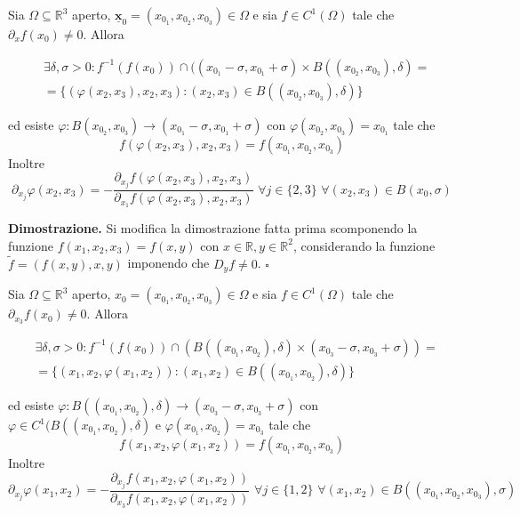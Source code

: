 \vspace{0.5cm}
\begin{theorem}[\textcolor{blue}{Funzione implicita rispetto a $y$ e $z$}]
Sia $\Omega \subseteq \mathbb{R}^3$ aperto, $\bm{\underline{x}}_0 = (x_{0_1}, x_{0_2}, x_{0_3}) \in \Omega$ e sia $f \in C^1 ( \Omega )$ tale che $\partial_x f(x_0) \neq 0$. Allora

\begin{align*}
&\exists \delta, \sigma > 0 : f^{-1}(f(x_0)) \cap ((x_{0_1} - \sigma, x_{0_1} + \sigma) \times B((x_{0_2}, x_{0_3}), \delta) = \\
&=\{ (\varphi(x_2, x_3), x_2, x_3) : (x_2, x_3) \in B((x_{0_2}, x_{0_3}), \delta) \}
\end{align*}

ed esiste $\varphi: B(x_{0_2}, x_{0_3}) \to (x_{0_1} - \sigma, x_{0_1} + \sigma)$ con $\varphi(x_{0_2}, x_{0_3}) = x_{0_1}$ tale che
$$
f(\varphi(x_2, x_3), x_2, x_3) = f(x_{0_1}, x_{0_2}, x_{0_3})
$$
Inoltre
$$
\partial_{x_j} \varphi(x_2, x_3) = -\frac{\partial_{x_j}f(\varphi(x_2, x_3), x_2, x_3)}{\partial_{x_1} f(\varphi(x_2, x_3), x_2, x_3)} \, \, \forall j \in \{2, 3 \} \, \, \forall (x_2, x_3) \in B(x_0, \sigma)
$$
\end{theorem}

\noindent \textbf{Dimostrazione. }
Si modifica la dimostrazione fatta prima scomponendo la funzione $f(x_{1}, x_2, x_3) = f(x, y)$ con $x \in \mathbb{R}, y \in \mathbb{R}^2$, considerando la funzione $\tilde{f} = (f(x, y), x, y)$ imponendo che $D_y f \neq 0$.
\hfill $\square$

\vspace{0.5cm}
\begin{theorem}[\textcolor{blue}{Della funzione implicita rispetto a $x$ e $y$}]
Sia $\Omega \subseteq \mathbb{R}^3$ aperto, $x_0 = (x_{0_1}, x_{0_2}, x_{0_3}) \in \Omega$ e sia $f \in C^1 (\Omega)$ tale che $\partial_{x_3} f(x_0) \neq 0$. Allora

\begin{align*}
&\exists \delta, \sigma > 0 : f^{-1}(f(x_0)) \cap (B((x_{0_1}, x_{0_2}), \delta) \times (x_{0_3} - \sigma, x_{0_3} + \sigma)) = \\
&=\{(x_1, x_2, \varphi(x_1, x_2)) : (x_1, x_2) \in B((x_{0_1}, x_{0_2}), \delta) \}
\end{align*}

ed esiste $\varphi: B((x_{0_1},x_{0_2}), \delta) \to (x_{0_3} - \sigma, x_{0_3} + \sigma)$ con $\varphi \in C^1(B((x_{0_1}, x_{0_2}), \delta)$ e $\varphi(x_{0_1}, x_{0_2}) = x_{0_3}$ tale che
$$
f(x_1, x_2, \varphi(x_1, x_2)) = f(x_{0_1}, x_{0_2}, x_{0_3})
$$
Inoltre
$$
\partial_{x_j} \varphi(x_1, x_2) = - \frac{\partial_{x_j} f(x_1, x_2, \varphi(x_1, x_2))}{\partial_{x_3} f(x_1, x_2, \varphi(x_1, x_2))} \, \, \forall j \in \{1, 2 \} \, \, \forall (x_1, x_2) \in B((x_{0_1}, x_{0_2}, x_{0_3}), \sigma)
$$
\end{theorem}

